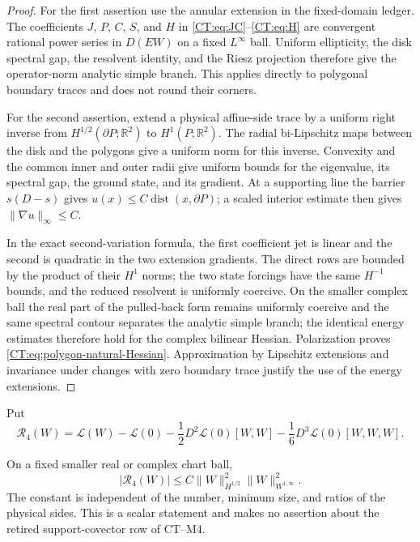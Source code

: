 \begin{proof}
For the first assertion use the annular extension in the fixed-domain
ledger.  The coefficients $J$, $P$, $C$, $S$, and $H$ in
\eqref{CT:eq:JC}--\eqref{CT:eq:H} are convergent rational power series in
$D(EW)$ on a fixed $L^\infty$ ball.  Uniform ellipticity, the disk spectral
gap, the resolvent identity, and the Riesz projection therefore give the
operator-norm analytic simple branch.  This applies directly to polygonal
boundary traces and does not round their corners.

For the second assertion, extend a physical affine-side trace by a uniform
right inverse from $H^{1/2}(\partial P;\mathbb R^2)$ to
$H^1(P;\mathbb R^2)$.  The radial bi-Lipschitz maps between the disk and
the polygons give a uniform norm for this inverse.  Convexity and the
common inner and outer radii give uniform bounds for the eigenvalue, its
spectral gap, the ground state, and its gradient.  At a supporting line
the barrier $s(D-s)$ gives
$u(x)\le C\operatorname {dist}(x,\partial P)$; a scaled interior estimate
then gives $\|\nabla u\|_\infty\le C$.

In the exact second-variation formula, the first coefficient jet is linear
and the second is quadratic in the two extension gradients.  The direct
rows are bounded by the product of their $H^1$ norms; the two state
forcings have the same $H^{-1}$ bounds, and the reduced resolvent is
uniformly coercive.  On the smaller complex ball the real part of the
pulled-back form remains uniformly coercive and the same spectral contour
separates the analytic simple branch; the identical energy estimates
therefore hold for the complex bilinear Hessian.  Polarization proves
\eqref{CT:eq:polygon-natural-Hessian}.  Approximation by Lipschitz extensions
and invariance under changes with zero boundary trace justify the use of
the energy extensions.
\end{proof}

Put
\begin{equation}\label{CT:eq:R4-definition}
 \mathcal R_4(W)=\mathcal L(W)-\mathcal L(0)
 -\frac12D^2\mathcal L(0)[W,W]
 -\frac16D^3\mathcal L(0)[W,W,W].
\end{equation}

\begin{corollary}
\label{CT:cor:tame-scalar-fourth}
On a fixed smaller real or complex chart ball,
\begin{equation}\label{CT:eq:tame-scalar-fourth}
 \boxed{
 |\mathcal R_4(W)|
 \le C\|W\|_{H^{1/2}}^2\|W\|_{W^{1,\infty}}^2.}
\end{equation}
The constant is independent of the number, minimum size, and ratios of the
physical sides.  This is a scalar statement and makes no assertion about
the retired support-covector row of CT--M4.
\end{corollary}

